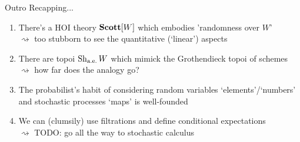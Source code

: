 \begin{frame}{Outro}
	Recapping...
	\begin{enumerate}
		\item There's a HOI theory $\mathbf{Scott}[W]$ which embodies 'randomness over $W$'\\
		$\rightsquigarrow$ {\color{colorgold}too stubborn to see the quantitative (`linear') aspects}
		\item There are topoi $\operatorname{Sh}_{\text{a.e.}} W$ which mimick the Grothendieck topoi of schemes\\
		$\rightsquigarrow$ {\color{colorgold} how far does the analogy go?}
		\item The probabilist's habit of considering random variables `elements'/`numbers' and stochastic processes `maps' is well-founded\\
		\item We can (clumsily) use filtrations and define conditional expectations\\
		$\rightsquigarrow$ {\color{colorgold}TODO: go all the way to stochastic calculus}
	\end{enumerate}
\end{frame}
